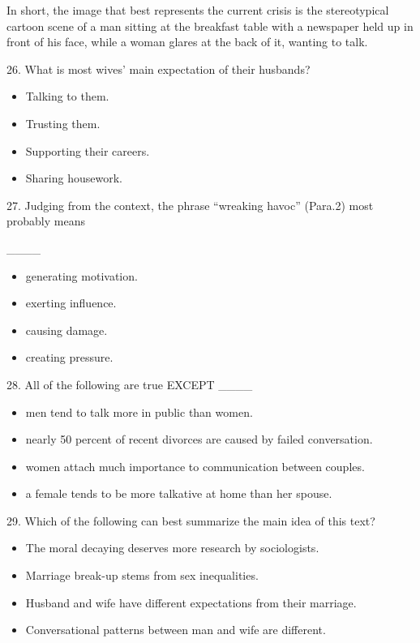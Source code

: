 \documentclass[UTF8,11pt]{ctexart}
\begin{document}
In short, the image that best represents the current crisis is the stereotypical cartoon scene of a man sitting at the breakfast table with a newspaper held up in front of his face, while a woman glares at the back of it, wanting to talk.


26. What is most wives’ main expectation of their husbands?


\begin{itemize}[leftmargin=2em,itemsep=.2em,topsep=.4em]\item[A.] Talking to them.
\item[B.] Trusting them.
\item[C.] Supporting their careers.
\item[D.] Sharing housework.
\end{itemize}

27. Judging from the context, the phrase “wreaking havoc” (Para.2) most probably means


\_\_\_\_


\begin{itemize}[leftmargin=2em,itemsep=.2em,topsep=.4em]\item[A.] generating motivation.
\item[B.] exerting influence.
\item[C.] causing damage.
\item[D.] creating pressure.
\end{itemize}

28. All of the following are true EXCEPT \_\_\_\_


\begin{itemize}[leftmargin=2em,itemsep=.2em,topsep=.4em]\item[A.] men tend to talk more in public than women.
\item[B.] nearly 50 percent of recent divorces are caused by failed conversation.
\item[C.] women attach much importance to communication between couples.
\item[D.] a female tends to be more talkative at home than her spouse.
\end{itemize}

29. Which of the following can best summarize the main idea of this text?


\begin{itemize}[leftmargin=2em,itemsep=.2em,topsep=.4em]\item[A.] The moral decaying deserves more research by sociologists.
\item[B.] Marriage break-up stems from sex inequalities.
\item[C.] Husband and wife have different expectations from their marriage.
\item[D.] Conversational patterns between man and wife are different.
\end{itemize}
\end{document}
